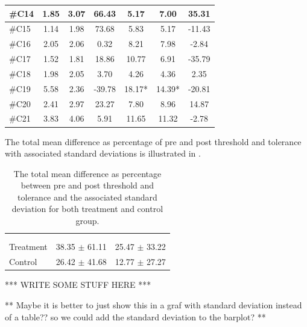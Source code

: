 \begin{longtable} {l|c|c|c|c|c|c}
\#C14 & 1.85 & 3.07 & 	66.43	 & 5.17 & 7.00 & 35.31 \\ \hline
\#C15 & 1.14 & 1.98 & 	73.68 & 5.83 & 5.17 & -11.43 \\ \hline
\#C16 & 2.05 & 2.06 & 	0.32 & 8.21 & 7.98 & -2.84 \\ \hline
\#C17 & 1.52 & 1.81 &	18.86 & 10.77 & 6.91 & -35.79 \\ \hline
\#C18 & 1.98 & 2.05 & 	3.70 & 4.26  &  4.36 & 2.35 \\ \hline
\#C19 & 5.58 & 2.36 & 	-39.78 & 18.17* & 14.39* & -20.81 \\ \hline
\#C20 & 2.41 & 2.97 &  23.27 & 7.80 &  8.96 & 14.87\\ \hline
\#C21 & 3.83 & 4.06 & 5.91  & 11.65 & 11.32 & -2.78 \\ \hline
\end{longtable}


The total mean difference as percentage of pre and post threshold and tolerance with associated standard deviations is illustrated in .


\begin{longtable} {l|c|c}
	\caption{The total mean difference as percentage between pre and post threshold and tolerance and the associated standard deviation for both treatment and control group.}
	\label{tab:Total} \\
\cellcolor[HTML]{C0C0C0} {} & 
\cellcolor[HTML]{C0C0C0}{\textbf{Threshold}} &  \cellcolor[HTML]{C0C0C0}{\textbf{Tolerance}}  	\\  \rule{0pt}{3ex} 		
\cellcolor[HTML]{C0C0C0}{} &
 \cellcolor[HTML]{C0C0C0}{Difference [\%]} &  \cellcolor[HTML]{C0C0C0}{Difference [\%]} \\ \hline
Treatment & 38.35 $\pm$ 61.11 & 25.47 $\pm$ 33.22 \\ \hline
Control & 26.42 $\pm$ 41.68 & 12.77 $\pm$ 27.27 \\ \hline
\end{longtable}
\vspace{-.5cm}

*** WRITE SOME STUFF HERE ***  

** Maybe it is better to just show this in a graf with standard deviation instead of a table??  so we could add the standard deviation to the barplot? ** 

